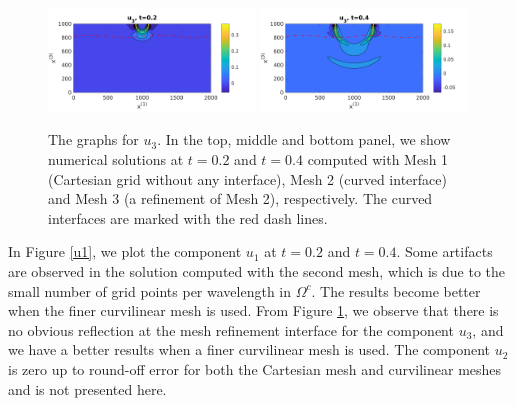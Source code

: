 \begin{figure}[htbp]
	\includegraphics[width=0.49\textwidth,trim={0.05cm 0.1cm 0.55cm 0.45cm}, clip]{u3_t02_curvi_finer.png}
	\includegraphics[width=0.49\textwidth,trim={0.05cm 0.1cm 0.55cm 0.45cm}, clip]{u3_t04_curvi_finer.png}
	\caption{The graphs for $u_3$. In the top, middle and bottom panel, we show numerical solutions at $t=0.2$ and $t=0.4$ computed with Mesh 1 (Cartesian grid without any interface), Mesh 2 (curved interface) and Mesh 3 (a refinement of Mesh 2), respectively. The curved interfaces are marked with the red dash lines.}
\label{u3}
\end{figure}
In Figure \ref{u1}, we plot the component $u_1$ at $t=0.2$ and $t=0.4$.  Some artifacts are observed in the solution computed with the second mesh, which is due to the small number of grid points per wavelength in $\Omega^c$. The results become better when the finer curvilinear mesh is used. From Figure \ref{u3}, we observe that there is no obvious reflection at the mesh refinement interface for the component $u_3$, and we have a better results when a finer curvilinear mesh is used. The component $u_2$ is zero up to round-off error for both the Cartesian mesh and curvilinear meshes and is not presented here.